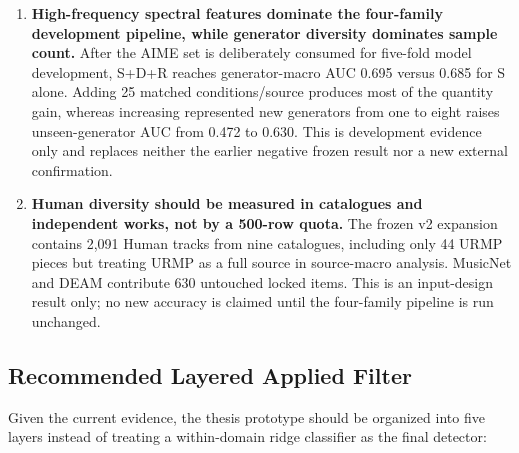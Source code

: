 \documentclass[11pt,a4paper]{article}
\begin{document}
\begin{enumerate}
  \item \textbf{High-frequency spectral features dominate the four-family development pipeline, while generator diversity dominates sample count.} After the AIME set is deliberately consumed for five-fold model development, S+D+R reaches generator-macro AUC 0.695 versus 0.685 for S alone. Adding 25 matched conditions/source produces most of the quantity gain, whereas increasing represented new generators from one to eight raises unseen-generator AUC from 0.472 to 0.630. This is development evidence only and replaces neither the earlier negative frozen result nor a new external confirmation.
  \item \textbf{Human diversity should be measured in catalogues and independent works, not by a 500-row quota.} The frozen v2 expansion contains 2,091 Human tracks from nine catalogues, including only 44 URMP pieces but treating URMP as a full source in source-macro analysis. MusicNet and DEAM contribute 630 untouched locked items. This is an input-design result only; no new accuracy is claimed until the four-family pipeline is run unchanged.
\end{enumerate}

\subsection{Recommended Layered Applied Filter}

Given the current evidence, the thesis prototype should be organized into five layers instead of treating a within-domain ridge classifier as the final detector:
\end{document}

